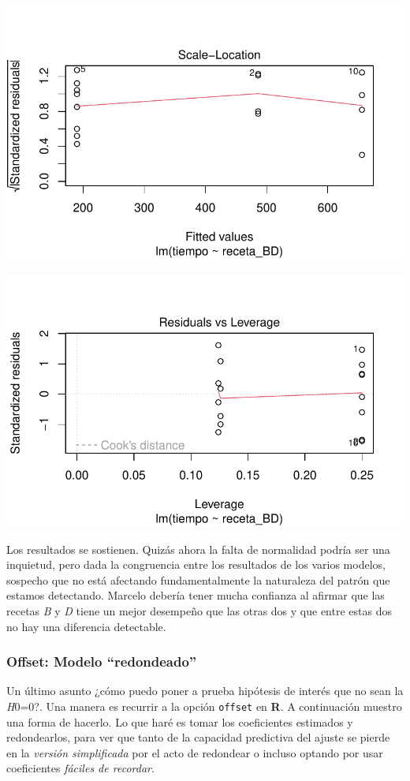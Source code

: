 \documentclass[
  letterpaper,
  DIV=11,
  numbers=noendperiod]{scrartcl}
\begin{document}
\includegraphics{solucion-masa-pizza_files/figure-pdf/modPond-combo-3.pdf}

\includegraphics{solucion-masa-pizza_files/figure-pdf/modPond-combo-4.pdf}

Los resultados se sostienen. Quizás ahora la falta de normalidad podría
ser una inquietud, pero dada la congruencia entre los resultados de los
varios modelos, sospecho que no está afectando fundamentalmente la
naturaleza del patrón que estamos detectando. Marcelo debería tener
mucha confianza al afirmar que las recetas \emph{B} y \emph{D} tiene un
mejor desempeño que las otras dos y que entre estas dos no hay una
diferencia detectable.

\subsubsection{Offset: Modelo
``redondeado''}\label{offset-modelo-redondeado}

Un último asunto ¿cómo puedo poner a prueba hipótesis de interés que no
sean la \emph{H}0=0?. Una manera es recurrir a la opción \texttt{offset}
en \textbf{R}. A continuación muestro una forma de hacerlo. Lo que haré
es tomar los coeficientes estimados y redondearlos, para ver que tanto
de la capacidad predictiva del ajuste se pierde en la \emph{versión
simplificada} por el acto de redondear o incluso optando por usar
coeficientes \emph{fáciles de recordar}.
\end{document}
